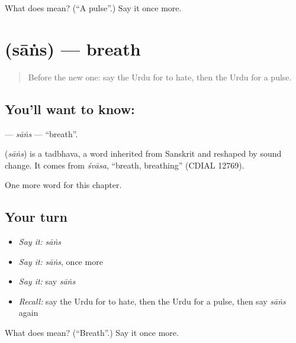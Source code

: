 \begin{tcolorbox}[breakable,colback=teal!4,colframe=teal!35!black,title={Before you move on}]
What does  mean? (\textquotedblleft{}A pulse\textquotedblright{}.) Say it once more.
\end{tcolorbox}
\section[\texorpdfstring{\ur{سانس} (sāṅs)}{سانس (sāṅs)}]{ (sāṅs) — breath}

\label{lesson:UR-C216-sans}



\begin{quote}
Before the new one: say the Urdu for to hate, then the Urdu for a pulse.
\end{quote}

\subsection*{You'll want to know: }
\textbf{} — \emph{sāṅs} — \textquotedblleft{}breath\textquotedblright{}.

\begin{cousinweb}
\textbf{} (\emph{sāṅs}) is a tadbhava, a word inherited from Sanskrit and reshaped by sound change. It comes from \emph{śvāsa}, \textquotedblleft{}breath, breathing\textquotedblright{} (CDIAL 12769).
\end{cousinweb}

\begin{grammarlens}[title={What you've built}]
One more word for this chapter.
\end{grammarlens}

\subsection*{Your turn}
\begin{itemize}
\raggedright
  \item \emph{Say it:} \emph{sāṅs}
  \item \emph{Say it:} \emph{sāṅs}, once more
  \item \emph{Say it:} say \emph{sāṅs}
  \item \emph{Recall:} say the Urdu for to hate, then the Urdu for a pulse, then say \emph{sāṅs} again
\end{itemize}

\begin{tcolorbox}[breakable,colback=teal!4,colframe=teal!35!black,title={Before you move on}]
What does  mean? (\textquotedblleft{}Breath\textquotedblright{}.) Say it once more.
\end{tcolorbox}
